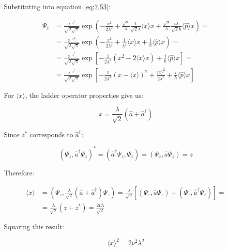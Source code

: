 Substituting into equation \eqref{eq:7.53}:

\begin{align}
\Psi_{z} & =\frac{\mathrm{e}^{-\nu^{2}}}{\sqrt{\lambda \sqrt{\pi}}} \exp \left(-\frac{x^{2}}{2 \lambda^{2}}+\frac{\sqrt{2}}{\lambda} \frac{1}{\sqrt{2} \lambda}\langle x\rangle x+\frac{\sqrt{2}}{\lambda} \frac{i \lambda}{\sqrt{2} \hbar}\langle\hat{p}\rangle x\right)= \\
& =\frac{\mathrm{e}^{-\nu^{2}}}{\sqrt{\lambda \sqrt{\pi}}} \exp \left(-\frac{x^{2}}{2 \lambda^{2}}+\frac{1}{\lambda^{2}}\langle x\rangle x+\frac{i}{\hbar}\langle\hat{p}\rangle x\right)= \\
& =\frac{\mathrm{e}^{-\nu^{2}}}{\sqrt{\lambda \sqrt{\pi}}} \exp \left[-\frac{1}{2 \lambda^{2}}\left(x^{2}-2\langle x\rangle x\right)+\frac{i}{\hbar}\langle\hat{p}\rangle x\right]=  \label{eq:7.61}\\
& =\frac{\mathrm{e}^{-\nu^{2}}}{\sqrt{\lambda \sqrt{\pi}}} \exp \left[-\frac{1}{2 \lambda^{2}}(x-\langle x\rangle)^{2}+\frac{\langle x\rangle^{2}}{2 \lambda^{2}}+\frac{i}{\hbar}\langle\hat{p}\rangle x\right]
\end{align}

For $\langle x\rangle$, the ladder operator properties give us:

\begin{equation}
x=\frac{\lambda}{\sqrt{2}}\left(\hat{a}+\hat{a}^{\dagger}\right)
\end{equation}

Since $z^{*}$ corresponds to $\hat{a}^{\dagger}$:

\begin{equation}
\left(\Psi_{z}, \hat{a}^{\dagger} \Psi_{z}\right)^{*}=\left(\hat{a}^{\dagger} \Psi_{z}, \Psi_{z}\right)=\left(\Psi_{z}, \hat{a} \Psi_{z}\right)=z
\end{equation}

Therefore:

\begin{align}
\langle x\rangle & =\left(\Psi_{z}, \frac{\lambda}{\sqrt{2}}\left(\hat{a}+\hat{a}^{\dagger}\right) \Psi_{z}\right)=\frac{\lambda}{\sqrt{2}}\left[\left(\Psi_{z}, \hat{a} \Psi_{z}\right)+\left(\Psi_{z}, \hat{a}^{\dagger} \Psi_{z}\right)\right]=  \\
& =\frac{\lambda}{\sqrt{2}}\left(z+z^{*}\right)=\frac{2 \nu \lambda}{\sqrt{2}}
\end{align}

Squaring this result:

\begin{equation}
\langle x\rangle^{2}=2 \nu^{2} \lambda^{2}
\end{equation}

